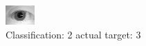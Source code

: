 \begin{figure}[h!]
\begin{center}
\includegraphics[width=0.60\columnwidth]{figures/ID1111_class_2_target_3.png}
\end{center}
\caption{ Classification: 2 actual target: 3}
\label{fig:ID1111_class_2_target_3}
\end{figure}
